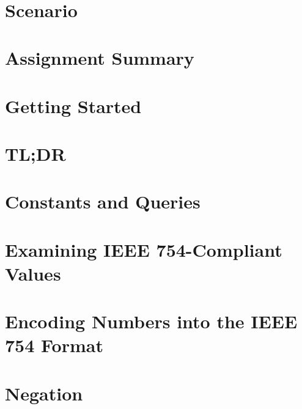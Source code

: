 \documentclass[12pt]{article}
\begin{document}
    \labidentifier\


    \softwareengineeringfrontmatter

    \section*{Scenario}         \scenariointroduction

    \section{Assignment Summary}                                        

    \section{Getting Started}                                           

    \section{TL;DR}                                                     

    \section{Constants and Queries} \label{sec:constantsAndQueries}     

    \section{Examining IEEE 754-Compliant Values}                       

    \section{Encoding Numbers into the IEEE 754 Format} \label{sec:encoding}
                                                                        

    \section{Negation}                                                  
\end{document}
